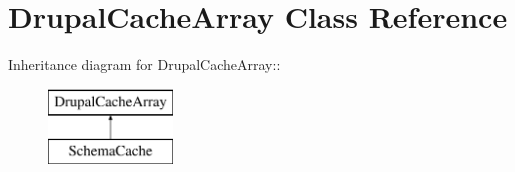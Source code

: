 \hypertarget{classDrupalCacheArray}{
\section{DrupalCacheArray Class Reference}
\label{classDrupalCacheArray}
}
Inheritance diagram for DrupalCacheArray::\begin{figure}[H]
\begin{center}
\leavevmode
\includegraphics[height=2cm]{classDrupalCacheArray}
\end{center}
\end{figure}
